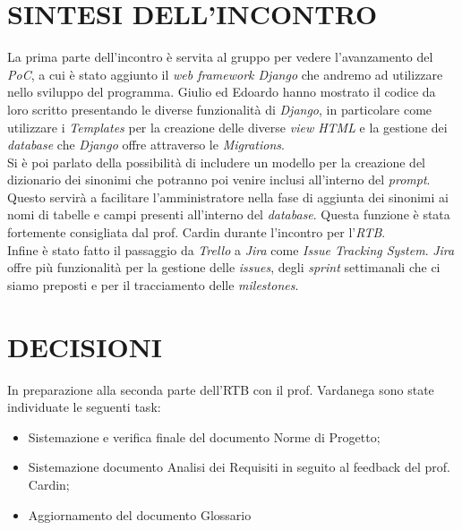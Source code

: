 \documentclass[5pt]{article}
\begin{document}
\section{SINTESI DELL'INCONTRO}
La prima parte dell'incontro è servita al gruppo per vedere l'avanzamento del \textit{PoC}, a cui è stato aggiunto il \textit{web framework Django} che andremo ad utilizzare nello sviluppo del programma. Giulio ed Edoardo hanno mostrato il codice da loro scritto presentando le diverse funzionalità di \textit{Django}, in particolare come utilizzare i \textit{Templates} per la creazione delle diverse \textit{view HTML} e la gestione dei \textit{database} che \textit{Django} offre attraverso le \textit{Migrations}. \\
Si è poi parlato della possibilità di includere un modello per la creazione del dizionario dei sinonimi che potranno poi venire inclusi all'interno del \textit{prompt}. Questo servirà a facilitare l'amministratore nella fase di aggiunta dei sinonimi ai nomi di tabelle e campi presenti all'interno del \textit{database}. Questa funzione è stata fortemente consigliata dal prof. Cardin durante l'incontro per l'\textit{RTB}. \\
Infine è stato fatto il passaggio da \textit{Trello} a \textit{Jira} come \textit{Issue Tracking System}. \textit{Jira} offre più funzionalità per la gestione delle \textit{issues}, degli \textit{sprint} settimanali che ci siamo preposti e per il tracciamento delle \textit{milestones}. 

\section{DECISIONI}
In preparazione alla seconda parte dell'RTB con il prof. Vardanega sono state individuate le seguenti task:
\begin{itemize}
	\item Sistemazione e verifica finale del documento Norme di Progetto;
	\item Sistemazione documento Analisi dei Requisiti in seguito al feedback del prof. Cardin;
	\item Aggiornamento del documento Glossario
\end{itemize}
\end{document}
